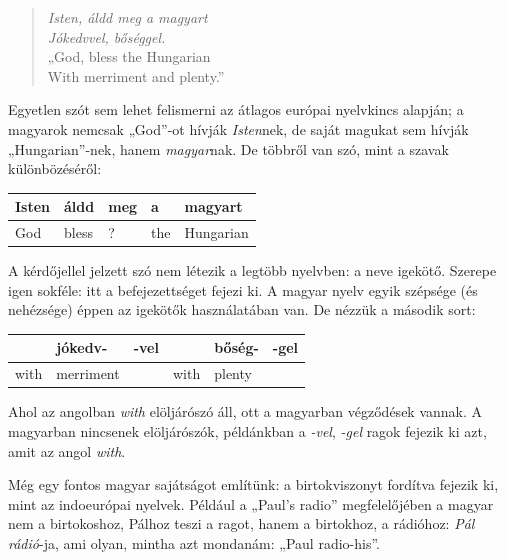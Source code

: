 \begin{multicols}{2}
  \begin{verse}

  \textit{Isten, áldd meg a magyart}\\
  \textit{Jókedvvel, bőséggel.}\\
  „God, bless the Hungarian\\
  With merriment and plenty.”
  \end{verse}

  Egyetlen szót sem lehet felismerni az átlagos európai nyelvkincs alapján; a magyarok nemcsak „God”-ot hívják \textit{Isten}nek, de saját magukat sem hívják „Hungarian”-nek, hanem \textit{magyar}nak. De többről van szó, mint a szavak különbözéséről:

  \vspace{3mm}

  \begin{tabular}{l|l|l|l|l}
      Isten & áldd & meg & a & magyart\\
      \hline
      God & bless & ? & the & Hungarian\\
    \end{tabular}

  \vspace{3mm}   

  A kérdőjellel jelzett szó nem létezik a legtöbb nyelvben: a neve igekötő. Szerepe igen sokféle: itt a befejezettséget fejezi ki. A magyar nyelv egyik szépsége (és nehézsége) éppen az igekötők használatában van. De nézzük a második sort:

  \vspace{3mm}

  \begin{tabular}{l|l|l|l|l|l}
      & jókedv- & -vel & & bőség- & -gel\\
      \hline
      with & merriment & & with & plenty & \\
    \end{tabular}

  \vspace{3mm}  

  Ahol az angolban \textit{with} elöljárószó áll, ott a ma\-gyar\-ban végződések vannak. A ma\-gyar\-ban nincsenek elöljárószók, pél\-dánk\-ban a \textit{-vel}, \textit{-gel} ragok fejezik ki azt, amit az angol \textit{with}.

  Még egy fontos magyar sajátságot említünk: a birtokviszonyt for\-dít\-va fejezik ki, mint az indoeurópai nyelvek. Például a „Paul's radio” meg\-fe\-le\-lő\-jé\-ben a magyar nem a birtokoshoz, Pálhoz teszi a ragot, hanem a birtokhoz, a rádióhoz: \textit{Pál rádió}-ja, ami olyan, mintha azt mondanám: „Paul radio-his”.


\end{multicols}
